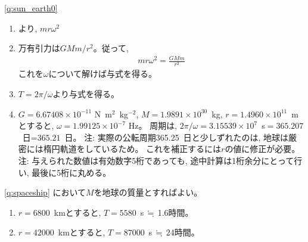 %
\ref{q:sun_earth0}
\begin{enumerate}
\item {}より, $mr\omega^2$
\item 万有引力は$GMm/r^2$。従って, 
\begin{eqnarray}mr\omega^2=\frac{GMm}{r^2}\end{eqnarray}
これを$\omega$について解けば与式を得る。
\item $T=2\pi/\omega$より与式を得る。
\item $G=6.67408\times10^{-11}$ N~m$^2$~kg$^{-2}$, $M=1.9891\times10^{30}$~kg, 
$r=1.4960\times10^{11}$~mとすると, $\omega=1.99125\times10^{-7}$ Hz。
周期は, $2\pi/\omega=3.15539\times10^7$~s$=365.207$~日=$365.21$~日。
注: 実際の公転周期365.25~日と少しずれたのは, 地球は厳密には楕円軌道をしているため。
これを補正するには$r$の値に修正が必要。
注: 与えられた数値は有効数字5桁であっても, 途中計算は1桁余分にとって行い, 最後に5桁に丸める。
\end{enumerate}
\mv

%
\ref{q:spaceship}
において$M$を地球の質量とすればよい。
\begin{enumerate}
\item $r=6800$~kmとすると, $T=5580$~s$\,\fallingdotseq\,$1.6時間。
\item $r=42000$~kmとすると, $T=87000$~s$\,\fallingdotseq\,$24時間。
\end{enumerate}

